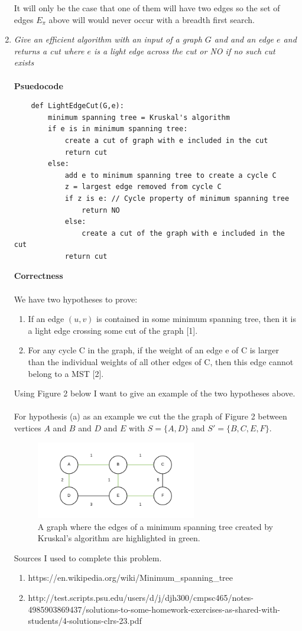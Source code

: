 \documentclass[12pt]{article}
\begin{document}
\begin{enumerate}
	It will only be the case that one of them will have two edges so the set of edges $E_\pi$ above will would never occur with a breadth first search.
	\newpage
	\item \textit{Give an efficient algorithm with an input of a graph $G$ and and an edge $e$ and returns a cut where $e$ is a light edge across the cut or NO if no such cut exists}\\
	\\
	\textbf{Psuedocode}
	\begin{verbatim}
	def LightEdgeCut(G,e):
	    minimum spanning tree = Kruskal's algorithm
	    if e is in minimum spanning tree:
	        create a cut of graph with e included in the cut
	        return cut
	    else:
	        add e to minimum spanning tree to create a cycle C
	        z = largest edge removed from cycle C
	        if z is e: // Cycle property of minimum spanning tree
	            return NO
	        else:
	    	    create a cut of the graph with e included in the cut
		    return cut
	\end{verbatim}
	
	\textbf{Correctness}\\
	\\
	We have two hypotheses to prove:
	\begin{enumerate}
		\item If an edge $(u, v)$ is contained in some minimum spanning tree, then it is a light edge crossing some cut of the graph [1].
		\item For any cycle C in the graph, if the weight of an edge e of C is larger than the individual weights of all other edges of C, then this edge cannot belong to a MST [2].
	\end{enumerate}
	Using Figure 2 below I want to give an example of the two hypotheses above.\\
	\\  
	For hypothesis (a) as an example we cut the the graph of Figure 2 between vertices $A$ and $B$ and $D$ and $E$ with $S = \{A,D\}$ and $S'=\{B,C,E,F\}$. \\
	\begin{figure}[h]
	\caption{A graph where the edges of a minimum spanning tree created by Kruskal's algorithm are highlighted in green.}
	\includegraphics[width=7cm]{ps2_q3.png}
	\centering
	\end{figure}
	Sources I used to complete this problem.
	\begin{enumerate}[1]
		\item https://en.wikipedia.org/wiki/Minimum\_spanning\_tree
		\item http://test.scripts.psu.edu/users/d/j/djh300/cmpsc465/notes-4985903869437/solutions-to-some-homework-exercises-as-shared-with-students/4-solutions-clrs-23.pdf 
	\end{enumerate}


\end{enumerate}
\end{document}
